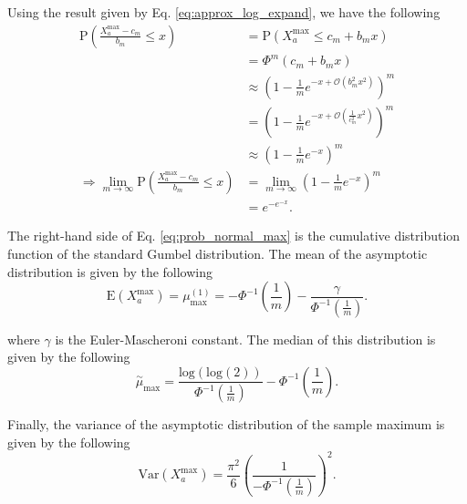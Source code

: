 \documentclass[10pt,letterpaper]{article}\usepackage[]{graphicx}\usepackage[]{color}
\begin{document}
Using the result given by Eq. \ref{eq:approx_log_expand}, we have the following
%
\begin{equation}\label{eq:prob_normal_max}
\begin{aligned}
\text{P}\left(\frac{X^\text{max}_a - c_m}{b_m} \leq x\right) &= \text{P}(X^\text{max}_a \leq c_m + b_m x) \\
&= \Phi^m(c_m + b_m x) \\
&\approx \left(1 - \frac{1}{m}e^{-x + \mathcal{O}(b^2_m x^2)}\right)^m \\
&= \left(1 - \frac{1}{m}e^{-x + \mathcal{O}\left(\frac{1}{c^2_m} x^2\right)}\right)^m \\
&\approx \left(1 - \frac{1}{m}e^{-x}\right)^m \\
\Rightarrow \lim_{m \to \infty} \text{P}\left(\frac{X^\text{max}_a - c_m}{b_m} \leq x\right) &= \lim_{m \to \infty} \left(1 - \frac{1}{m}e^{-x}\right)^m \\
&= e^{-e^{-x}}.
\end{aligned}
\end{equation}

The right-hand side of Eq. \ref{eq:prob_normal_max} is the cumulative distribution function of the standard Gumbel distribution. The mean of the asymptotic distribution is given by the following
%
\begin{equation}\label{eq:mu_max_normal}
\text{E}(X^\text{max}_a) = \mu^{(1)}_\text{max} = -\Phi^{-1} \left(\frac{1}{m}\right) - \frac{\gamma}{\Phi^{-1}\left(\frac{1}{m}\right)}.
\end{equation}

\noindent where $\gamma$ is the Euler-Mascheroni constant. The median of this distribution is given by the following
%
\begin{equation}\label{eq:med_max_normal}
\overset{\sim}{\mu}_\text{max} = \frac{\text{log}(\text{log}(2))}{\Phi^{-1}\left(\frac{1}{m}\right)} - \Phi^{-1}\left(\frac{1}{m}\right).
\end{equation}

Finally, the variance of the asymptotic distribution of the sample maximum is given by the following
%
\begin{equation}\label{eq:var_max_normal}
\text{Var}(X^\text{max}_a) = \frac{\pi^2}{6}\left(\frac{1}{-\Phi^{-1}\left(\frac{1}{m}\right)}\right)^2.
\end{equation}
\end{document}
